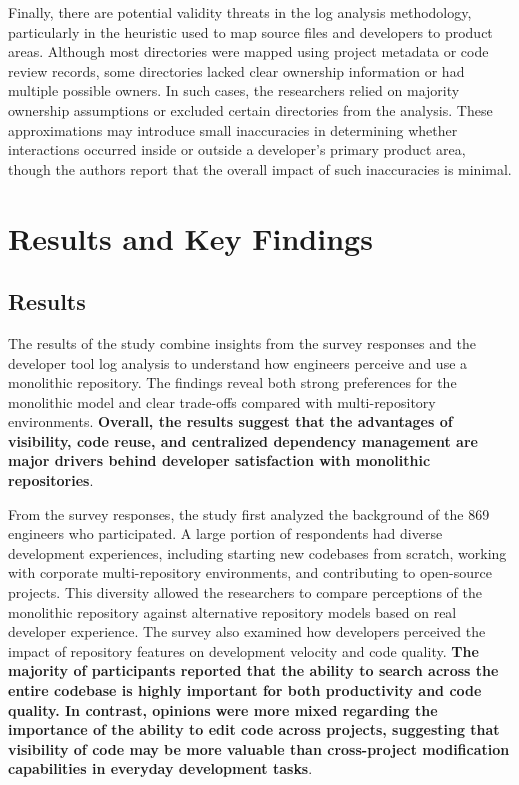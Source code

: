 Finally, there are potential validity threats in the log analysis methodology, particularly in the heuristic used to map source files and developers to product areas. Although most directories were mapped using project metadata or code review records, some directories lacked clear ownership information or had multiple possible owners. In such cases, the researchers relied on majority ownership assumptions or excluded certain directories from the analysis. These approximations may introduce small inaccuracies in determining whether interactions occurred inside or outside a developer's primary product area, though the authors report that the overall impact of such inaccuracies is minimal.

\section{Results and Key Findings}
\subsection{Results}
The results of the study combine insights from the survey responses and the developer tool log analysis to understand how engineers perceive and use a monolithic repository. The findings reveal both strong preferences for the monolithic model and clear trade-offs compared with multi-repository environments. \textbf{Overall, the results suggest that the advantages of visibility, code reuse, and centralized dependency management are major drivers behind developer satisfaction with monolithic repositories}.

From the survey responses, the study first analyzed the background of the 869 engineers who participated. A large portion of respondents had diverse development experiences, including starting new codebases from scratch, working with corporate multi-repository environments, and contributing to open-source projects. This diversity allowed the researchers to compare perceptions of the monolithic repository against alternative repository models based on real developer experience. The survey also examined how developers perceived the impact of repository features on development velocity and code quality. \textbf{The majority of participants reported that the ability to search across the entire codebase is highly important for both productivity and code quality. In contrast, opinions were more mixed regarding the importance of the ability to edit code across projects, suggesting that visibility of code may be more valuable than cross-project modification capabilities in everyday development tasks}.

